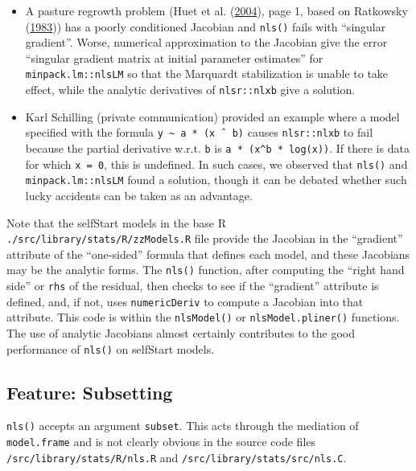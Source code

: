 \documentclass[
]{article}
\begin{document}
\begin{itemize}
\item
  A pasture regrowth problem (Huet et al.
  (\protect\hyperlink{ref-Huet2004}{2004}), page 1, based on Ratkowsky
  (\protect\hyperlink{ref-Ratkowsky1983}{1983})) has a poorly
  conditioned Jacobian and \texttt{nls()} fails with ``singular
  gradient''. Worse, numerical approximation to the Jacobian give the
  error ``singular gradient matrix at initial parameter estimates'' for
  \texttt{minpack.lm::nlsLM} so that the Marquardt stabilization is
  unable to take effect, while the analytic derivatives of
  \texttt{nlsr::nlxb} give a solution.
\item
  Karl Schilling (private communication) provided an example where a
  model specified with the formula
  \texttt{y\ \textasciitilde{}\ a\ *\ (x\ ˆ\ b)} causes
  \texttt{nlsr::nlxb} to fail because the partial derivative w.r.t.
  \texttt{b} is \texttt{a\ *\ (x\^{}b\ *\ log(x))}. If there is data for
  which \texttt{x\ =\ 0}, this is undefined. In such cases, we observed
  that \texttt{nls()} and \texttt{minpack.lm::nlsLM} found a solution,
  though it can be debated whether such lucky accidents can be taken as
  an advantage.
\end{itemize}

Note that the selfStart models in the base R
\texttt{./src/library/stats/R/zzModels.R} file provide the Jacobian in
the ``gradient'' attribute of the ``one-sided'' formula that defines
each model, and these Jacobians may be the analytic forms. The
\texttt{nls()} function, after computing the ``right hand side'' or
\texttt{rhs} of the residual, then checks to see if the ``gradient''
attribute is defined, and, if not, uses \texttt{numericDeriv} to compute
a Jacobian into that attribute. This code is within the
\texttt{nlsModel()} or \texttt{nlsModel.pliner()} functions. The use of
analytic Jacobians almost certainly contributes to the good performance
of \texttt{nls()} on selfStart models.

\hypertarget{feature-subsetting}{%
\subsection{Feature: Subsetting}\label{feature-subsetting}}

\texttt{nls()} accepts an argument \texttt{subset}. This acts through
the mediation of \texttt{model.frame} and is not clearly obvious in the
source code files \texttt{/src/library/stats/R/nls.R} and
\texttt{/src/library/stats/src/nls.C}.
\end{document}
